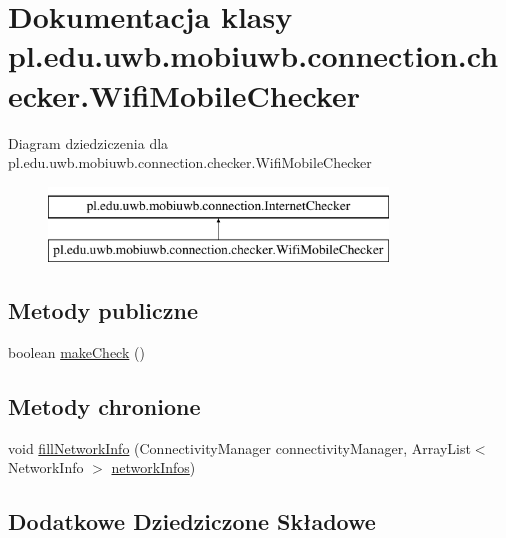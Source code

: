 \hypertarget{classpl_1_1edu_1_1uwb_1_1mobiuwb_1_1connection_1_1checker_1_1_wifi_mobile_checker}{}\section{Dokumentacja klasy pl.\+edu.\+uwb.\+mobiuwb.\+connection.\+checker.\+Wifi\+Mobile\+Checker}
\label{classpl_1_1edu_1_1uwb_1_1mobiuwb_1_1connection_1_1checker_1_1_wifi_mobile_checker}
Diagram dziedziczenia dla pl.\+edu.\+uwb.\+mobiuwb.\+connection.\+checker.\+Wifi\+Mobile\+Checker\begin{figure}[H]
\begin{center}
\leavevmode
\includegraphics[height=2.000000cm]{classpl_1_1edu_1_1uwb_1_1mobiuwb_1_1connection_1_1checker_1_1_wifi_mobile_checker}
\end{center}
\end{figure}
\subsection*{Metody publiczne}
\begin{DoxyCompactItemize}
\item 
boolean \hyperlink{classpl_1_1edu_1_1uwb_1_1mobiuwb_1_1connection_1_1checker_1_1_wifi_mobile_checker_a29b5998dd84b0525bc7d55ccaa14ae8d}{make\+Check} ()
\end{DoxyCompactItemize}
\subsection*{Metody chronione}
\begin{DoxyCompactItemize}
\item 
void \hyperlink{classpl_1_1edu_1_1uwb_1_1mobiuwb_1_1connection_1_1checker_1_1_wifi_mobile_checker_a78417c1f2c00255115cba3e977f700cf}{fill\+Network\+Info} (Connectivity\+Manager connectivity\+Manager, Array\+List$<$ Network\+Info $>$ \hyperlink{classpl_1_1edu_1_1uwb_1_1mobiuwb_1_1connection_1_1_internet_checker_a2edc06b95c5a74eee801d1dd2643b464}{network\+Infos})
\end{DoxyCompactItemize}
\subsection*{Dodatkowe Dziedziczone Składowe}


